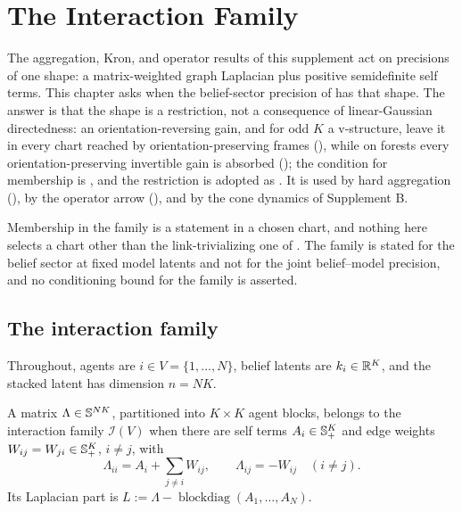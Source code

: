 \chapter{The Interaction Family}
\label{ch:gaussian}

The aggregation, Kron, and operator results of this supplement act on
precisions of one shape: a matrix-weighted graph Laplacian plus positive
semidefinite self terms. This chapter asks when the belief-sector precision of
 has that shape. The answer is that the shape is
a restriction, not a consequence of linear-Gaussian directedness: an
orientation-reversing gain, and for odd \(K\) a v-structure, leave it in every
chart reached by orientation-preserving frames
(), while on forests every
orientation-preserving invertible gain is absorbed
(); the condition for membership is
, and the restriction is adopted
as . It is used by hard aggregation
(), by the operator arrow
(), and by the cone dynamics of Supplement B.

Membership in the family is a statement in a chosen chart, and nothing here
selects a chart other than the link-trivializing one of
. The family is stated for the belief sector
at fixed model latents and not for the joint belief--model precision, and no
conditioning bound for the family is asserted. 

\section{The interaction family}
\label{sec:gauss-interaction-family}

Throughout, agents are \(i\in V=\{1,\dots,N\}\), belief latents are
\(k_i\in\mathbb R^K\), and the stacked latent has dimension \(n=NK\).

A matrix \(\Lambda\in\mathbb S^{NK}\), partitioned into \(K\times K\) agent blocks,
belongs to the interaction family \(\mathcal I(V)\) when there are self terms
\(A_i\in\mathbb S_{+}^{K}\) and edge weights \(W_{ij}=W_{ji}\in\mathbb S_{+}^{K}\), \(i\neq j\),
with
\begin{equation}
\Lambda_{ii}=A_i+\sum_{j\neq i}W_{ij},
\qquad
\Lambda_{ij}=-W_{ij}\quad(i\neq j).
\label{eq:gauss-interaction-family}
\end{equation}
Its Laplacian part is \(L:=\Lambda-\operatorname{blockdiag}(A_1,\dots,A_N)\).


